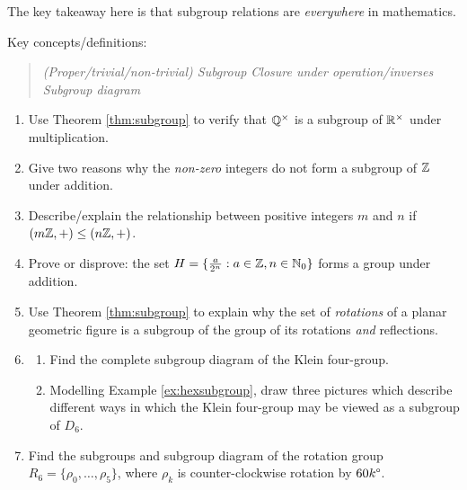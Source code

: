 The key takeaway here is that subgroup relations are \emph{everywhere} in mathematics.


\goodbreak

\begin{exercises}
	Key concepts/definitions:
	\begin{quote}
		\emph{(Proper/trivial/non-trivial) Subgroup
		\quad Closure under operation/inverses
		\quad Subgroup diagram}
	\end{quote}
	
	
	\begin{enumerate}
	  \item Use Theorem \ref{thm:subgroup} to verify that $\Q^\times$ is a subgroup of $\R^\times$ under multiplication.
	  
	  
		\item Give two reasons why the \emph{non-zero} integers do not form a subgroup of $\Z$ under addition.
	  	
	  	
	  \item Describe/explain the relationship between positive integers $m$ and $n$ if $(m\Z,+)\le (n\Z,+)$.
	
	
	  \item Prove or disprove: the set $H=\{\frac a{2^n}:a\in\Z,n\in\N_0\}$ forms a group under addition.
	    
	    
	  \item Use Theorem \ref{thm:subgroup} to explain why the set of \emph{rotations} of a planar geometric figure is a subgroup of the group of its rotations \emph{and} reflections.
	  
	 
	  \item\begin{enumerate}
	    \item Find the complete subgroup diagram of the Klein four-group.
	    
	  	\item Modelling Example \ref{ex:hexsubgroup}, draw three pictures which describe different ways in which the Klein four-group may be viewed as a subgroup of $D_6$.
	  \end{enumerate}
	  
	  
	  \item Find the subgroups and subgroup diagram of the rotation group $R_6=\{\rho_0,\ldots,\rho_5\}$, where $\rho_k$ is counter-clockwise rotation by $\ang{60k}$. 
	  

\end{enumerate}
\end{exercises}
